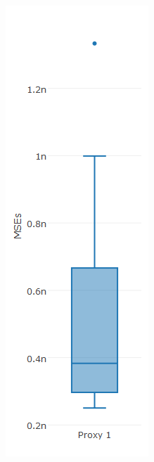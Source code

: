 \begin{figure}[!h]
{\begin{subfigure}{.25\linewidth}
  \includegraphics[width=\linewidth]{img/6msigmaMsebp.png}

\end{subfigure}}
\end{figure}
